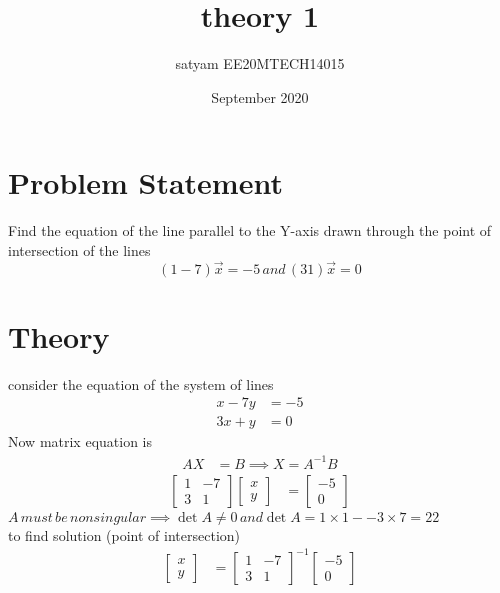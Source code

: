 \documentclass{article}
\title{theory 1}
\author{satyam EE20MTECH14015}
\date{September 2020}
\begin{document}
\section{Problem Statement}
Find the equation of the line parallel to the Y-axis drawn through the point of intersection of the lines
\[
(1 -7)\vec{x}=-5 \, and \, (3 1)\vec{x}=0
\]
\section{Theory}
consider the equation of the system of lines
\begin{align*}
x - 7y & = -5 \\    
3x + y & = 0          
\end{align*}
Now matrix equation is 
\begin{align*}
    A X & = B \implies X = A ^ {-1} B
\end{align*}
\begin{align*}
\left[\begin{array}{cc}
{1} & {-7}\\{3} & {1}
\end{array}
           \right] \left[\begin{array}{cc}
                         x\\
                          y
                         \end{array}
                                     \right] & =
                                      \left[\begin{array}{cc}
                                           -5\\
                                            0
                                        \end{array}
                                                   \right]
\end{align*}
$ A\, must\, be \, non singular\implies\det A \neq 0\, and \det A ={1}\times{1}-{-3}\times{7}=22 $ \\
to find solution (point of intersection)
\begin{align*}
\left[\begin{array}{cc}
x\\
y
\end{array}
           \right] & = 
           \begin{bmatrix}
          {1} & {-7} \\ 
          {3} & {1}
       \end{bmatrix}^{-1}\left[\begin{array}{cc}
                                 -5\\
                                 0
                                \end{array}
                                          \right]
\end{align*}
\end{document}
